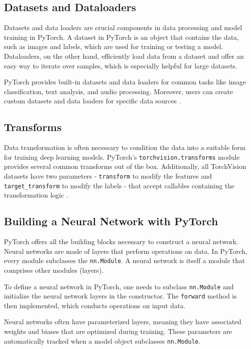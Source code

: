 \subsection{Datasets and Dataloaders}

Datasets and data loaders are crucial components in data processing and model training in PyTorch. A dataset in PyTorch is an object that contains the data, such as images and labels, which are used for training or testing a model. Dataloaders, on the other hand, efficiently load data from a dataset and offer an easy way to iterate over samples, which is especially helpful for large datasets.

PyTorch provides built-in datasets and data loaders for common tasks like image classification, text analysis, and audio processing. Moreover, users can create custom datasets and data loaders for specific data sources \cite[Datasets and DataLoaders]{pytorch_tutorial}.

\subsection{Transforms}

Data transformation is often necessary to condition the data into a suitable form for training deep learning models. PyTorch's \verb|torchvision.transforms| module provides several common transforms out of the box. Additionally, all TorchVision datasets have two parameters - \verb|transform| to modify the features and \verb|target_transform| to modify the labels - that accept callables containing the transformation logic \cite[Transforms]{pytorch_tutorial}.

\subsection{Building a Neural Network with PyTorch}

PyTorch offers all the building blocks necessary to construct a neural network. Neural networks are made of layers that perform operations on data. In PyTorch, every module subclasses the \verb|nn.Module|. A neural network is itself a module that comprises other modules (layers). 

To define a neural network in PyTorch, one needs to subclass \verb|nn.Module| and initialize the neural network layers in the constructor. The \verb|forward| method is then implemented, which conducts operations on input data.

Neural networks often have parameterized layers, meaning they have associated weights and biases that are optimized during training. These parameters are automatically tracked when a model object subclasses \verb|nn.Module|.

